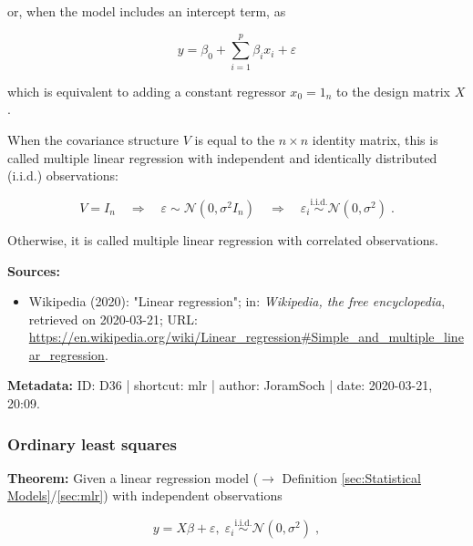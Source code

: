 \documentclass[a4paper,12pt,twoside]{book}
\begin{document}
or, when the model includes an intercept term, as

\begin{equation} \label{eq:mlr-mlr-model-sum-base}
y = \beta_0 + \sum_{i=1}^{p} \beta_i x_i + \varepsilon
\end{equation}

which is equivalent to adding a constant regressor $x_0 = 1_n$ to the design matrix $X$.

When the covariance structure $V$ is equal to the $n \times n$ identity matrix, this is called multiple linear regression with independent and identically distributed (i.i.d.) observations:

\begin{equation} \label{eq:mlr-mlr-noise-iid}
V = I_n \quad \Rightarrow \quad \varepsilon \sim \mathcal{N}(0, \sigma^2 I_n) \quad \Rightarrow \quad \varepsilon_i \overset{\text{i.i.d.}}{\sim} \mathcal{N}(0, \sigma^2) \; .
\end{equation}

Otherwise, it is called multiple linear regression with correlated observations.


\vspace{1em}
\textbf{Sources:}
\begin{itemize}
\item Wikipedia (2020): "Linear regression"; in: \textit{Wikipedia, the free encyclopedia}, retrieved on 2020-03-21; URL: \url{https://en.wikipedia.org/wiki/Linear_regression#Simple_and_multiple_linear_regression}.
\end{itemize}


\vspace{1em}
\textbf{Metadata:} ID: D36 | shortcut: mlr | author: JoramSoch | date: 2020-03-21, 20:09.
\vspace{1em}



\subsubsection[\textbf{Ordinary least squares}]{Ordinary least squares} \label{sec:mlr-ols}
\setcounter{equation}{0}

\textbf{Theorem:} Given a linear regression model ($\rightarrow$ Definition \ref{sec:Statistical Models}/\ref{sec:mlr}) with independent observations

\begin{equation} \label{eq:mlr-ols-MLR}
y = X\beta + \varepsilon, \; \varepsilon_i \overset{\mathrm{i.i.d.}}{\sim} \mathcal{N}(0, \sigma^2) \; ,
\end{equation}
\end{document}
